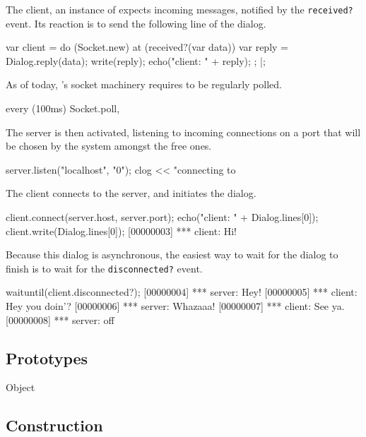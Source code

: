 The client, an instance of  expects incoming
messages, notified by the \lstinline|received?| event.  Its reaction
is to send the following line of the dialog.

\begin{urbiscript}
var client =
  do (Socket.new)
  {
    at (received?(var data))
    {
      var reply = Dialog.reply(data);
      write(reply);
      echo("client: " + reply);
    };
  }|;
\end{urbiscript}

As of today, \us's socket machinery requires to be regularly polled.

\begin{urbiscript}
every (100ms)
  Socket.poll,
\end{urbiscript}

The server is then activated, listening to incoming connections on a
port that will be chosen by the system amongst the free ones.

\begin{urbiscript}
server.listen("localhost", "0");
clog << "connecting to %
\end{urbiscript}

The client connects to the server, and initiates the dialog.

\begin{urbiscript}
client.connect(server.host, server.port);
echo("client: " + Dialog.lines[0]);
client.write(Dialog.lines[0]);
[00000003] *** client: Hi!
\end{urbiscript}

Because this dialog is asynchronous, the easiest way to wait for the
dialog to finish is to wait for the \lstinline|disconnected?| event.

\begin{urbiscript}
waituntil(client.disconnected?);
[00000004] *** server: Hey!
[00000005] *** client: Hey you doin'?
[00000006] *** server: Whazaaa!
[00000007] *** client: See ya.
[00000008] *** server: off
\end{urbiscript}

\subsection{Prototypes}
\begin{refObjects}
\item[Object]
\end{refObjects}

\subsection{Construction}

